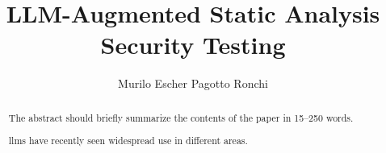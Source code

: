 \documentclass[runningheads]{llncs}
\begin{document}
%
\title{LLM-Augmented Static Analysis Security Testing}
%
%
%
\author{Murilo Escher Pagotto Ronchi}
%
\maketitle %
%
%
\begin{abstract}
The abstract should briefly summarize the contents of the paper in
15--250 words.

\Aclp{llm} have recently seen widespread use in different areas.

\end{abstract}
%
%





%
%
\appendix

%
%


%
\end{document}
